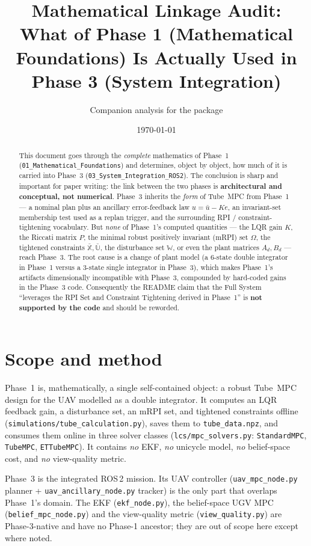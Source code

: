 \documentclass[11pt]{article}
\title{\textbf{Mathematical Linkage Audit:\\[2pt]
What of Phase 1 (Mathematical Foundations) Is Actually Used in Phase 3 (System Integration)}}
\author{Companion analysis for the \code{ugv\_uav\_control} package}
\date{\today}
\newcommand{\Wset}{\mathbb{W}}
\newcommand{\Xset}{\mathbb{X}}
\newcommand{\Uset}{\mathbb{U}}
\newcommand{\code}[1]{\texttt{#1}}
\begin{document}
\maketitle

\begin{abstract}
This document goes through the \emph{complete} mathematics of Phase~1
(\code{01\_Mathematical\_Foundations}) and determines, object by object, how much of it is
carried into Phase~3 (\code{03\_System\_Integration\_ROS2}). The conclusion is sharp and important
for paper writing: the link between the two phases is \textbf{architectural and conceptual, not
numerical}. Phase~3 inherits the \emph{form} of Tube~MPC from Phase~1 --- a nominal plan plus an
ancillary error-feedback law $u=\bar u-Ke$, an invariant-set membership test used as a replan
trigger, and the surrounding RPI / constraint-tightening vocabulary. But \emph{none} of Phase~1's
computed quantities --- the LQR gain $K$, the Riccati matrix $P$, the minimal robust positively
invariant (mRPI) set $\Omega$, the tightened constraints $\bar{\Xset},\bar{\Uset}$, the disturbance
set $\Wset$, or even the plant matrices $A_d,B_d$ --- reach Phase~3. The root cause is a change of
plant model (a $6$-state double integrator in Phase~1 versus a $3$-state single integrator in
Phase~3), which makes Phase~1's artifacts dimensionally incompatible with Phase~3, compounded by
hard-coded gains in the Phase~3 code. Consequently the README claim that the Full System
``leverages the RPI Set and Constraint Tightening derived in Phase~1'' is \textbf{not supported by
the code} and should be reworded.
\end{abstract}

\tableofcontents

\section{Scope and method}
Phase~1 is, mathematically, a single self-contained object: a robust Tube~MPC design for the UAV
modelled as a double integrator. It computes an LQR feedback gain, a disturbance set, an mRPI set,
and tightened constraints offline (\code{simulations/tube\_calculation.py}), saves them to
\code{tube\_data.npz}, and consumes them online in three solver classes
(\code{lcs/mpc\_solvers.py}: \code{StandardMPC}, \code{TubeMPC}, \code{ETTubeMPC}).
It contains \emph{no} EKF, \emph{no} unicycle model, \emph{no} belief-space cost, and \emph{no}
view-quality metric.

Phase~3 is the integrated ROS\,2 mission. Its UAV controller (\code{uav\_mpc\_node.py} planner +
\code{uav\_ancillary\_node.py} tracker) is the only part that overlaps Phase~1's domain. The
EKF (\code{ekf\_node.py}), the belief-space UGV MPC (\code{belief\_mpc\_node.py}) and the
view-quality metric (\code{view\_quality.py}) are Phase-3-native and have no Phase-1 ancestor; they
are out of scope here except where noted.
\end{document}
